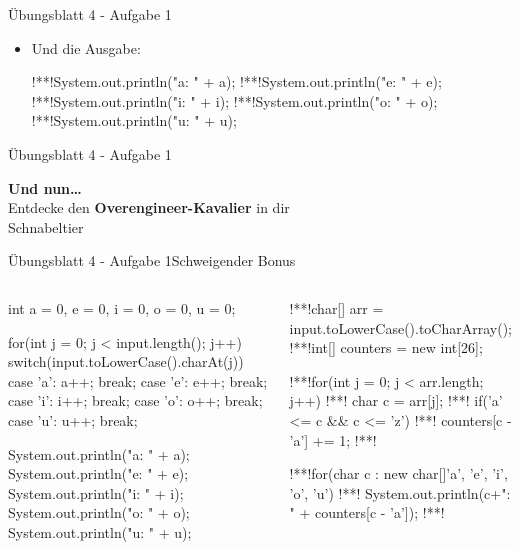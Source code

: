 \begin{frame}[fragile]{Übungsblatt 4 - Aufgabe 1}
    \begin{itemize}[<+(1)->]
        \item Und die Ausgabe:
\begin{plainjava}
!**!System.out.println("a: " + a);
!**!System.out.println("e: " + e);
!**!System.out.println("i: " + i);
!**!System.out.println("o: " + o);
!**!System.out.println("u: " + u);
\end{plainjava}
    \end{itemize}
\end{frame}

\iffull
\begin{frame}[c]{Übungsblatt 4 - Aufgabe 1}
\begin{center}
    \LARGE\pause\textbf{Und nun\ldots}\\
    \pause Entdecke den \textbf{Overengineer-Kavalier} in dir\bigskip\\
    \pause \scriptsize Schnabeltier
\end{center}
\end{frame}
\fi

\begin{frame}[fragile,c]{Übungsblatt 4 - Aufgabe 1\hfill Schweigender Bonus}
\begin{columns}[onlytextwidth,c]
\pause
\begin{plainjava}
int a = 0, e = 0, i = 0, o = 0, u = 0;

for(int j = 0; j < input.length(); j++) {
    switch(input.toLowerCase().charAt(j)) {
        case 'a': a++; break;
        case 'e': e++; break;
        case 'i': i++; break;
        case 'o': o++; break;
        case 'u': u++; break;
    }
}

System.out.println("a: " + a);
System.out.println("e: " + e);
System.out.println("i: " + i);
System.out.println("o: " + o);
System.out.println("u: " + u);
\end{plainjava}
\pause
\begin{plainjava}
!**!char[] arr  = input.toLowerCase().toCharArray();
!**!int[] counters = new int[26];

!**!for(int j = 0; j < arr.length; j++) {
!**!    char c = arr[j];
!**!    if('a' <= c && c <= 'z')
!**!        counters[c - 'a'] += 1;
!**!}

!**!for(char c : new char[]{'a', 'e', 'i', 'o', 'u'}) {
!**!    System.out.println(c+": " + counters[c - 'a']);
!**!}
\end{plainjava}
\end{columns}
\end{frame}


